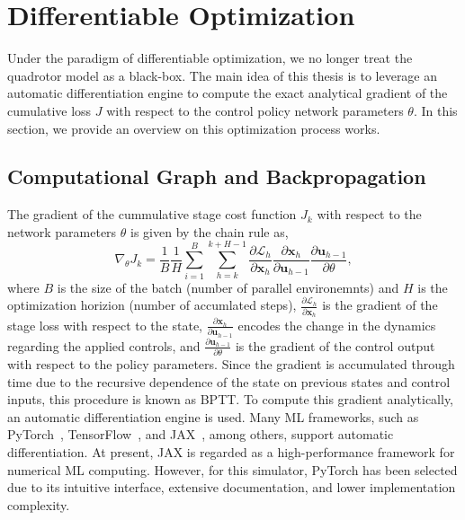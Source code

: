 \section{Differentiable Optimization} \label{sec:diff-opt}

Under the paradigm of differentiable optimization, we no longer treat the quadrotor model as a black-box.
The main idea of this thesis is to leverage an automatic differentiation engine to compute the exact analytical gradient of the cumulative loss $J$ with respect to the control policy network parameters $\theta$.
In this section, we provide an overview on this optimization process works.

\subsection{Computational Graph and Backpropagation}
The gradient of the cummulative stage cost function $J_k$ with respect to the network parameters $\theta$ is given by the chain rule as,
\begin{equation}
    \nabla_\theta J_k =
    \frac{1}{B}\frac{1}{H} \sum_{i=1}^{B} \sum_{h=k}^{k+H-1}
    \frac{\partial \mathcal{L}_h}{\partial \mathbf{x}_h}
    \frac{\partial \mathbf{x}_h}{\partial \mathbf{u}_{h-1}}
    \frac{\partial \mathbf{u}_{h-1}}{\partial \theta},
\end{equation}
\noindent where $B$ is the size of the batch (number of parallel environemnts) and $H$ is the optimization horizion (number of accumlated steps), $\frac{\partial \mathcal{L}_h}{\partial \mathbf{x}_h}$ is the gradient of
the stage loss with respect to the state, $\frac{\partial \mathbf{x}_h}{\partial
\mathbf{u}_{h-1}}$ encodes the change in the dynamics regarding the applied controls, and
$\frac{\partial \mathbf{u}_{h-1}}{\partial \theta}$ is the gradient of the control output
with respect to the policy parameters.
Since the gradient is accumulated through time due to the recursive dependence of the state on previous states and control inputs, this procedure is known as \ac{BPTT}.
To compute this gradient analytically, an automatic differentiation engine is used. 
Many \ac{ML} frameworks, such as PyTorch~\cite{paszke_pytorch_2019}, TensorFlow~\cite{abadi_tensorflow_2016}, and JAX~\cite{jax2018github}, among others, support automatic differentiation. 
At present, JAX is regarded as a high-performance framework for numerical \ac{ML} computing. 
However, for this simulator, PyTorch has been selected due to its intuitive interface, extensive documentation, and lower implementation complexity.

